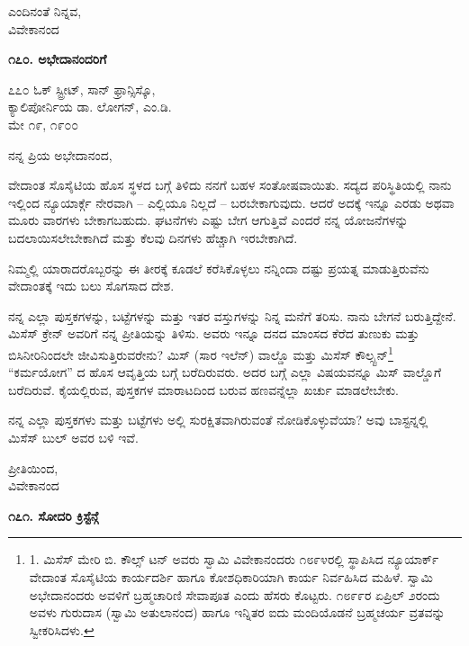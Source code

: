 \begin{flushright}
ಎಂದಿನಂತೆ ನಿನ್ನವ,\\ವಿವೇಕಾನಂದ
\end{flushright}

\begin{center}
\textbf{೧೭೦. ಅಭೇದಾನಂದರಿಗೆ}
\end{center}

\begin{flushright}
೭೭೦ ಓಕ್ ಸ್ಟ್ರೀಟ್, ಸಾನ್ ಫ್ರಾನ್ಸಿಸ್ಕೊ,\\ಕ್ಯಾಲಿಪೋರ್ನಿಯ  ಡಾ. ಲೋಗನ್, ಎಂ.ಡಿ.\\ಮೇ ೧೯, ೧೯೦೦
\end{flushright}

ನನ್ನ ಪ್ರಿಯ ಅಭೇದಾನಂದ,

ವೇದಾಂತ ಸೊಸೈಟಿಯ ಹೊಸ ಸ್ಥಳದ ಬಗ್ಗೆ ತಿಳಿದು ನನಗೆ ಬಹಳ ಸಂತೋಷವಾಯಿತು. ಸದ್ಯದ ಪರಿಸ್ಥಿತಿಯಲ್ಲಿ ನಾನು ಇಲ್ಲಿಂದ ನ್ಯೂಯಾರ್ಕ್ಗೆ ನೇರವಾಗಿ – ಎಲ್ಲಿಯೂ ನಿಲ್ಲದೆ – ಬರಬೇಕಾಗುವುದು. ಆದರೆ ಅದಕ್ಕೆ ಇನ್ನೂ ಎರಡು ಅಥವಾ ಮೂರು ವಾರಗಳು ಬೇಕಾಗಬಹುದು. ಘಟನೆಗಳು ಎಷ್ಟು ಬೇಗ ಆಗುತ್ತಿವೆ ಎಂದರೆ ನನ್ನ ಯೋಜನೆಗಳನ್ನು ಬದಲಾಯಿಸಲೇಬೇಕಾಗಿದೆ ಮತ್ತು ಕೆಲವು ದಿನಗಳು ಹೆಚ್ಚಾಗಿ ಇರಬೇಕಾಗಿದೆ.

ನಿಮ್ಮಲ್ಲಿ ಯಾರಾದರೊಬ್ಬರನ್ನು ಈ ತೀರಕ್ಕೆ ಕೂಡಲೆ ಕರೆಸಿಕೊಳ್ಳಲು ನನ್ನಿಂದಾ ದಷ್ಟು ಪ್ರಯತ್ನ ಮಾಡುತ್ತಿರುವೆನು ವೇದಾಂತಕ್ಕೆ ಇದು ಬಲು ಸೊಗಸಾದ ದೇಶ.

ನನ್ನ ಎಲ್ಲಾ ಪುಸ್ತಕಗಳನ್ನು, ಬಟ್ಟೆಗಳನ್ನು ಮತ್ತು ಇತರ ವಸ್ತುಗಳನ್ನು ನಿನ್ನ ಮನೆಗೆ ತರಿಸು. ನಾನು ಬೇಗನೆ ಬರುತ್ತಿದ್ದೇನೆ. ಮಿಸೆಸ್ ಕ್ರೇನ್ ಅವರಿಗೆ ನನ್ನ ಪ್ರೀತಿಯನ್ನು ತಿಳಿಸು. ಅವರು ಇನ್ನೂ ದನದ ಮಾಂಸದ ಕೆರೆದ ತುಣುಕು ಮತ್ತು ಬಿಸಿನೀರಿನಿಂದಲೇ ಜೀವಿಸುತ್ತಿರುವರೇನು? ಮಿಸ್ (ಸಾರ ಇಲೆನ್) ವಾಲ್ಡೊ ಮತ್ತು ಮಿಸೆಸ್ ಕೌಲ್ಸ್ಟನ್\footnote{1. ಮಿಸೆಸ್ ಮೇರಿ ಬಿ. ಕೌಲ್ಸ್ ಟನ್ ಅವರು ಸ್ವಾಮಿ ವಿವೇಕಾನಂದರು ೧೮೯೪ರಲ್ಲಿ ಸ್ಥಾಪಿಸಿದ ನ್ಯೂಯಾರ್ಕ್ ವೇದಾಂತ ಸೊಸೈಟಿಯ ಕಾರ್ಯದರ್ಶಿ ಹಾಗೂ ಕೋಶಧಿಕಾರಿಯಾಗಿ ಕಾರ್ಯ ನಿರ್ವಹಿಸಿದ ಮಹಿಳೆ. ಸ್ವಾಮಿ ಅಭೇದಾನಂದರು ಅವಳಿಗೆ ಬ್ರಹ್ಮಚಾರಿಣಿ ಸೇವಾಪೂತ ಎಂದು ಹೆಸರು ಕೊಟ್ಟರು. ೧೮೯೯ರ ಏಪ್ರಿಲ್ ೨ರಂದು ಅವಳು ಗುರುದಾಸ (ಸ್ವಾಮಿ ಅತುಲಾನಂದ) ಹಾಗೂ ಇನ್ನಿತರ ಐದು ಮಂದಿಯೊಡನೆ ಬ್ರಹ್ಮಚರ್ಯ ವ್ರತವನ್ನು ಸ್ವೀಕರಿಸಿದಳು.} “ಕರ್ಮಯೋಗ” ದ ಹೊಸ ಆವೃತ್ತಿಯ ಬಗ್ಗೆ ಬರೆದಿರುವರು. ಅದರ ಬಗ್ಗೆ ಎಲ್ಲಾ ವಿಷಯವನ್ನೂ ಮಿಸ್ ವಾಲ್ಡೊಗೆ ಬರೆದಿರುವೆ. ಕೈಯಲ್ಲಿರುವ, ಪುಸ್ತಕಗಳ ಮಾರಾಟದಿಂದ ಬರುವ ಹಣವನ್ನೆಲ್ಲಾ ಖರ್ಚು ಮಾಡಲೇಬೇಕು.

ನನ್ನ ಎಲ್ಲಾ ಪುಸ್ತಕಗಳು ಮತ್ತು ಬಟ್ಟೆಗಳು ಅಲ್ಲಿ ಸುರಕ್ಷಿತವಾಗಿರುವಂತೆ ನೋಡಿಕೊಳ್ಳುವೆಯಾ? ಅವು ಬಾಸ್ಟನ್ನಲ್ಲಿ ಮಿಸೆಸ್ ಬುಲ್ ಅವರ ಬಳಿ ಇವೆ.

\begin{flushright}
ಪ್ರೀತಿಯಿಂದ,\\ವಿವೇಕಾನಂದ
\end{flushright}

\begin{center}
\textbf{೧೭೧. ಸೋದರಿ ಕ್ರಿಸ್ಟೆನ್ಗೆ}
\end{center}

